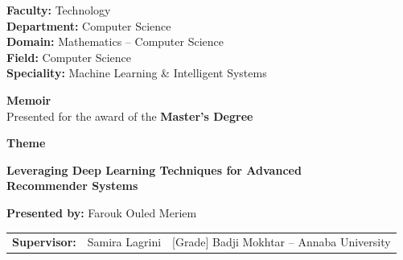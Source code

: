 \documentclass[12pt,a4paper]{report}
\begin{document}
\begin{titlepage}
  \begin{flushleft}
    {\small \textbf{Faculty:} Technology}\\[2pt]
    {\small \textbf{Department:} Computer Science}\\[2pt]
    {\small \textbf{Domain:} Mathematics -- Computer Science}\\[2pt]
    {\small \textbf{Field:} Computer Science}\\[2pt]
    {\small \textbf{Speciality:} Machine Learning \& Intelligent Systems}
  \end{flushleft}

  \vspace{0.5cm}

  \begin{center}
    {\large\bfseries Memoir}\\[4pt]
    {\normalsize Presented for the award of the \textbf{Master's Degree}}
  \end{center}

  \vspace{0.25cm}
  \begin{center}{\large\bfseries Theme}\end{center}
  \vspace{0.25cm}

  \begin{mdframed}[
    linecolor=black, linewidth=1pt,
    innertopmargin=14pt, innerbottommargin=14pt,
    innerleftmargin=18pt, innerrightmargin=18pt,
    roundcorner=4pt
  ]
    \begin{center}
      {\large\bfseries
        Leveraging Deep Learning Techniques for Advanced\\[5pt]
        Recommender Systems
      }
    \end{center}
  \end{mdframed}

  \vspace{0.55cm}

  \begin{center}
    \textbf{Presented by:} \quad Farouk Ouled Meriem
  \end{center}

  \vspace{0.35cm}

  \begin{center}
    \begin{tabular}{lll}
      \textbf{Supervisor:} & Samira Lagrini \quad & [Grade] \quad Badji Mokhtar -- Annaba University
    \end{tabular}
  \end{center}


\end{titlepage}
\end{document}
